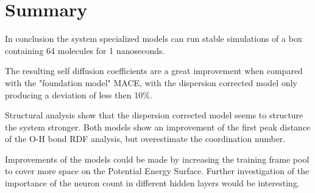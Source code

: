 \section{Summary}

In conclusion the system specialized models can run stable simulations of a box containing 64 molecules for 1 nanoseconds.

The resulting self diffusion coefficients are a great improvement when compared with the "foundation model" MACE, with the dispersion corrected model only producing a deviation of less then 10\%.

Structural analysis show that the dispersion corrected model seems to structure the system stronger. Both models show an improvement of the first peak distance of the \(\text{O-H}\) bond RDF analysis, but overestimate the coordination number.

Improvements of the models could be made by increasing the training frame pool to cover more space on the Potential Energy Surface.
Further investigation of the importance of the neuron count in different hidden layers would be interesting.